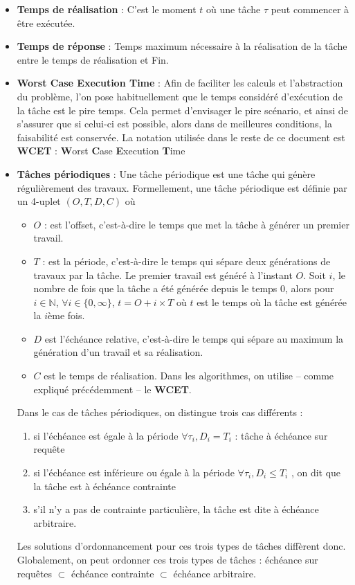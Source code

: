 \documentclass[11pt,a4paper,oneside]{report}
\newcommand{\customhighlight}[1]{{\textbf{#1}}}
\begin{document}
	\begin{itemize}
		\item \textbf{Temps de réalisation}\label{tempsderealisation} : C'est le moment $t$ où une tâche $\tau$ peut commencer à être exécutée.
		\item \textbf{Temps de réponse\label{Response Time}} : Temps maximum nécessaire à la réalisation de la tâche 
		entre le temps de réalisation et Fin.
		\item \textbf{Worst Case Execution Time}\label{wcet} : Afin de faciliter les calculs et l'abstraction du problème, l'on pose habituellement que le temps considéré d'exécution de 
		la tâche est le pire temps. Cela permet d'envisager le pire scénario, et ainsi 
		de s'assurer que si celui-ci est possible, alors dans de meilleures conditions, 
		la faisabilité est conservée. La notation utilisée dans le reste de ce document 
		est  \customhighlight{WCET} : \textbf{W}orst \textbf{C}ase \textbf{E}xecution \textbf{T}ime
		
		\item \textbf{Tâches périodiques} :
		Une tâche périodique est une tâche qui génère régulièrement des travaux.  
		Formellement, une tâche périodique est définie par un 4-uplet $(O, T, D, C)$ où \medskip
		\begin{itemize}
			\item \textbf{$O$} : est l'\og offset\fg{}, c'est-à-dire le temps que met la tâche à générer un premier travail.
			\item \textbf{$T$} : est la période, c'est-à-dire le temps qui sépare deux générations de travaux par la tâche. 
			Le premier travail est généré à l'instant $O$. Soit $i$, le nombre de fois que la tâche a été générée depuis le temps $0$,			
			 alors pour $i \in \mathbb{N}$, $\forall i \in \{0, \infty \}$,  $t = O + i\times T$ 
			où $t$ est le temps où la tâche est générée la $i$ème fois.
			\item \textbf{$D$} est l'échéance relative, c'est-à-dire le temps qui sépare au maximum la génération 
			d'un travail et sa réalisation.
			\item \textbf{$C$} est le temps de réalisation. Dans les algorithmes, on utilise -- comme expliqué précédemment -- le \customhighlight{WCET}.
		\end{itemize}	
		Dans le cas de tâches périodiques, on distingue trois cas différents : \medskip
		\begin{enumerate}
			\item si l'échéance est égale à la période $\forall \tau_i, D_i = T_i$ : tâche à \label{echeancesurrequete}échéance sur requête
			\item si l'échéance est inférieure ou égale à la période $\forall \tau_i, D_i \leq T_i $ , on dit que la tâche est à \label{echeancecontrainte} échéance contrainte
			\item s'il n'y a pas de contrainte particulière, la tâche est dite \og à échéance arbitraire\fg{}\label{echeancearbitraire}.
		\end{enumerate}
		Les solutions d'ordonnancement pour ces trois types de tâches diffèrent donc. 
		Globalement, on peut ordonner ces trois types de tâches : \medskip
		échéance sur requêtes $\subset$ échéance contrainte $\subset$ échéance arbitraire.
		

\end{itemize}
\end{document}
